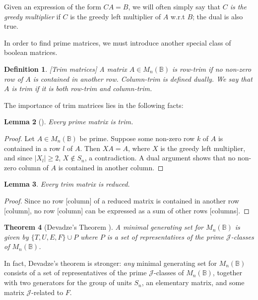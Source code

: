 \documentclass[11pt]{article}
\newtheorem{thm}{Theorem}[section]
\newtheorem{lemma}[thm]{Lemma}
\newtheorem{defi}[thm]{Definition}
\newenvironment{de}{\begin{defi}\rm}{\end{defi}}
\numberwithin{equation}{section}
\newcommand{\B}{\mathbb{B}}
\newcommand{\Bn}{M_n(\B)}
\newcommand{\J}{\mathscr{J}}
\begin{document}
Given an expression of the form $CA = B$, we will often simply say that
\textit{$C$ is the greedy multiplier} if $C$ is the greedy left multiplier
of $A$ w.r.t $B$; the dual is also true.

In order to find prime matrices, we must introduce another special class of
boolean matrices.

\begin{de}[Trim matrices]
  A matrix $A \in \Bn$ is \emph{row-trim} if no non-zero row of $A$ is contained in
  another row. \emph{Column-trim} is defined dually. We say that $A$ is
  \emph{trim} if it is both row-trim and column-trim.
\end{de}

The importance of trim matrices lies in the following facts:
\begin{lemma}[\cite{Konieczny2011aa}]
  Every prime matrix is trim.
\end{lemma}
\begin{proof}
  Let $A \in \Bn$ be prime. Suppose some non-zero row $k$ of $A$ is contained in
  a row $l$ of $A$. Then $XA = A$, where $X$ is the greedy left multiplier, and
  since $|X_l| \geq 2$, $X \not\in S_n$, a contradiction. A dual argument shows
  that no non-zero column of $A$ is contained in another column.
\end{proof}

\begin{lemma}
  Every trim matrix is reduced.
\end{lemma}
\begin{proof}
  Since no row [column] of a reduced matrix is contained in another row
  [column], no row [column] can be expressed as a sum of other rows [columns].
\end{proof}


\begin{thm}[Devadze's Theorem \cite{Konieczny2011aa}]
  A minimal generating set for $\Bn$ is given by $\{T, U, E, F\} \cup P$
  where $P$ is a set of representatives of the prime $\J$-classes of $\Bn$.
\end{thm}

In fact, Devadze's theorem is stronger: \emph{any} minimal generating set for
$\Bn$ consists of a set of representatives of the prime $\J$-classes of $\Bn$,
together with two generators for the group of units $S_n$, an elementary matrix,
and some matrix $\J$-related to $F$. 
\end{document}
